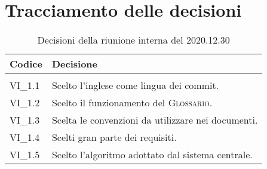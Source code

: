 \section{Tracciamento delle decisioni}

	
	\begin{longtable}{ >{\centering}p{} >{}p{}}
		
		\rowcolorhead
		\textbf{\color{white}Codice} 
		& \centering\textbf{\color{white}Decisione} 
		\tabularnewline 
		\endfirsthead
		
		\caption{Decisioni della riunione interna del 2020.12.30}\\	
		
		VI\_1.1 & Scelto l'inglese come lingua dei commit.
		
		\tabularnewline 
		VI\_1.2 & Scelto il funzionamento del \textsc{Glossario}.
		
		\tabularnewline 
		VI\_1.3 & Scelta le convenzioni da utilizzare nei documenti.
	
		\tabularnewline 
		VI\_1.4 & Scelti gran parte dei requisiti.
		
		\tabularnewline 
		VI\_1.5 & Scelto l'algoritmo adottato dal sistema centrale.
		
	
	\end{longtable}
	
